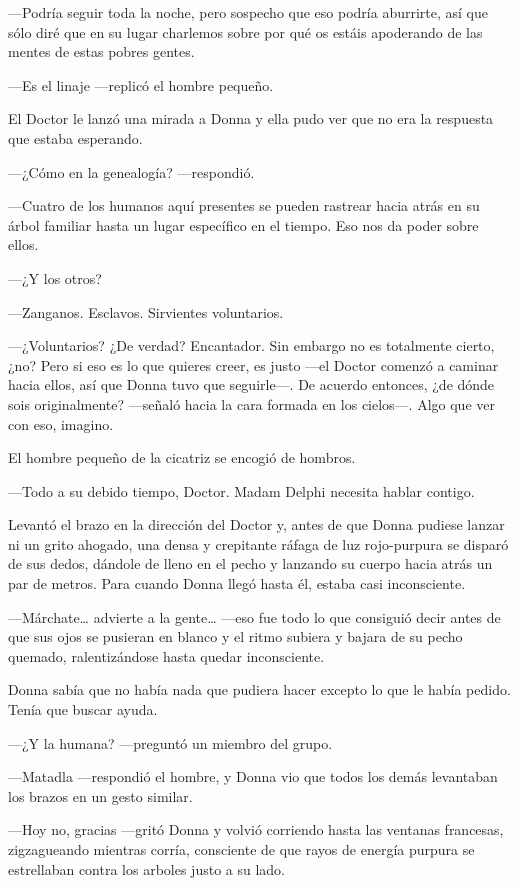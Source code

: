 ---Podría seguir toda la noche, pero sospecho que eso podría aburrirte,
así que sólo diré que en su lugar charlemos sobre por qué os estáis
apoderando de las mentes de estas pobres gentes.

---Es el linaje ---replicó el hombre pequeño.

El Doctor le lanzó una mirada a Donna y ella pudo ver que no era
la respuesta que estaba esperando.

---¿Cómo en la genealogía? ---respondió.

---Cuatro de los humanos aquí presentes se pueden rastrear hacia
atrás en su árbol familiar hasta un lugar específico en el tiempo. Eso
nos da poder sobre ellos.

---¿Y los otros?

---Zanganos. Esclavos. Sirvientes voluntarios.

---¿Voluntarios? ¿De verdad? Encantador. Sin embargo no es totalmente
cierto, ¿no? Pero si eso es lo que quieres creer, es justo ---el Doctor
comenzó a caminar hacia ellos, así que Donna tuvo que seguirle---. De
acuerdo entonces, ¿de dónde sois originalmente? ---señaló hacia la cara
formada en los cielos---. Algo que ver con eso, imagino.

El hombre pequeño de la cicatriz se encogió de hombros.

---Todo a su debido tiempo, Doctor. Madam Delphi necesita hablar
contigo.

Levantó el brazo en la dirección del Doctor y, antes de que Donna
pudiese lanzar ni un grito ahogado, una densa y crepitante ráfaga de luz
rojo-purpura se disparó de sus dedos, dándole de lleno en el pecho y
lanzando su cuerpo hacia atrás un par de metros. Para cuando Donna llegó
hasta él, estaba casi inconsciente.

---Márchate\ldots{} advierte a la gente\ldots{} ---eso fue todo lo que
consiguió decir antes de que sus ojos se pusieran en blanco y el ritmo
subiera y bajara de su pecho quemado, ralentizándose hasta quedar
inconsciente.

Donna sabía que no había nada que pudiera hacer excepto lo que
le había pedido. Tenía que buscar ayuda.

---¿Y la humana? ---preguntó un miembro del grupo.

---Matadla ---respondió el hombre, y Donna vio que todos los
demás levantaban los brazos en un gesto similar.

---Hoy no, gracias ---gritó Donna y volvió corriendo hasta las
ventanas francesas, zigzagueando mientras corría, consciente de que
rayos de energía purpura se estrellaban contra los arboles justo a su
lado.

